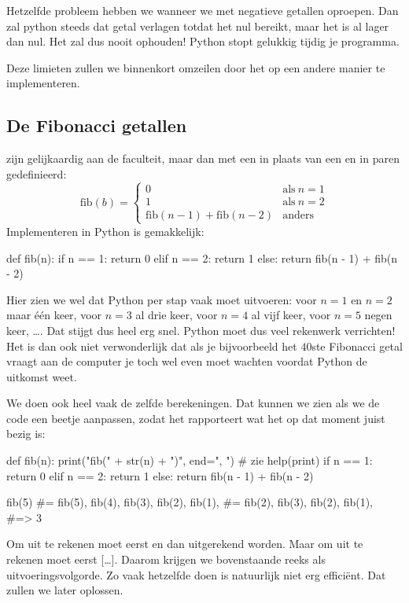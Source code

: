   Hetzelfde probleem hebben we wanneer we  met negatieve getallen
  oproepen. Dan zal python steeds dat getal verlagen totdat het nul bereikt,
  maar het is al lager dan nul. Het zal dus nooit ophouden! Python stopt
  gelukkig tijdig je programma.

  Deze limieten zullen we binnenkort omzeilen door het op een andere manier te
  implementeren.

  \subsection{De Fibonacci getallen} zijn gelijkaardig aan de faculteit, maar
  dan met een \py{+} in plaats van een \py{*} en in paren gedefinieerd:
  \begin{equation*}
    \text{fib}\left(b\right) = %
    \begin{cases}
      0                                                       & \text{als}\ n=1 \\
      1                                                       & \text{als}\ n=2 \\
      \text{fib}\left(n-1\right) + \text{fib}\left(n-2\right) & \text{anders}
    \end{cases}
  \end{equation*}
  Implementeren in Python is gemakkelijk:
  \begin{python}
    def fib(n):
      if n == 1: return 0
      elif n == 2: return 1
      else: return fib(n - 1) + fib(n - 2)
  \end{python}

  Hier zien we wel dat Python per stap vaak  moet uitvoeren: voor $n=1$
  en $n=2$ maar \'e\'en keer, voor $n=3$ al drie keer, voor $n=4$ al vijf keer,
  voor $n=5$ negen keer, \ldots. Dat stijgt dus heel erg snel. Python moet dus
  veel rekenwerk verrichten! Het is dan ook niet verwonderlijk dat als je
  bijvoorbeeld het $40$ste Fibonacci getal vraagt aan de computer je toch wel
  even moet wachten voordat Python de uitkomst weet.

  We doen ook heel vaak de zelfde berekeningen. Dat kunnen we zien als we de
  code een beetje aanpassen, zodat het rapporteert wat het op dat moment juist
  bezig is:
  \begin{python}
    def fib(n):
      print("fib(" + str(n) + ")", end=", ") # zie help(print)
      if n == 1: return 0
      elif n == 2: return 1
      else: return fib(n - 1) + fib(n - 2)
  \end{python}
  \begin{python}
    fib(5)
    #= fib(5), fib(4), fib(3), fib(2), fib(1),
    #=   fib(2), fib(3), fib(2), fib(1),
    #=> 3
  \end{python}
  Om  uit te rekenen moet eerst  en dan 
  uitgerekend worden. Maar om  uit te rekenen moet eerst [\ldots].
  Daarom krijgen we bovenstaande reeks als uitvoeringsvolgorde.
  Zo vaak hetzelfde doen is natuurlijk niet erg effici\"ent. Dat zullen we later
  oplossen.

